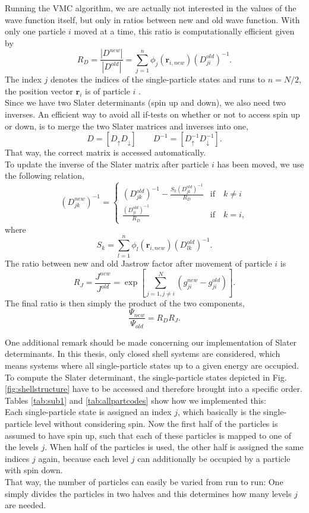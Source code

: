 Running the VMC algorithm, we are actually not interested in the values of the wave function itself, but only in ratios between new and old wave function. With only one particle $i$ moved at a time, this ratio is computationally efficient given by \cite{SkriptMorten}
\[
R_D = \frac{|D^{new}|}{|D^{old}|} = \sum\limits_{j=1}^n \phi_j\left(\mathbf{r}_{i, new}\right) \left(D_{ji}^{old}\right)^{-1}.
\]
The index $j$ denotes the indices of the single-particle states and runs to $n= N/2$, the position vector $\mathbf{r}_i$ is of particle $i$ .\\
Since we have two Slater determinants (spin up and down), we also need two inverses. An efficient way to avoid all if-tests on whether or not to access spin up or down, is to merge the two Slater matrices and inverses into one,
\[
D = \left[ D_{\uparrow} D_{\downarrow} \right] \qquad D^{-1} = \left[ D_{\uparrow}^{-1} D_{\downarrow}^{-1} \right].
\]
That way, the correct matrix is accessed automatically.\\
To update the inverse of the Slater matrix after particle $i$ has been moved, we use the following relation,
\[
\left(D_{jk}^{new}\right)^{-1} = \begin{cases}
\left(D_{jk}^{old}\right)^{-1} - \frac{S_k \left(D_{jk}^{old}\right)^{-1}}{R_D} & \text{if}\quad k \neq i \\
\frac{\left(D_{ji}^{old}\right)^{-1}}{R_D} & \text{if}\quad k = i, 
\end{cases}
\]
where 
\[
S_k = \sum\limits_{l=1}^ n \phi_l\left(\mathbf{r}_{i, new}\right)\left(D_{lk}^{old}\right)^{-1}.
\]
The ratio between new and old Jastrow factor after movement of particle $i$ is
\[
R_J = \frac{J^{new}}{J^{old}} = \exp\left[\sum\limits_{j=1, j\neq i}^ N \left(g_{ji}^{new} - g_{ji}^{old}\right) \right].
\]
The final ratio is then simply the product of the two components,
\[
\frac{\Psi_{new}}{\Psi_{old}} = R_D R_J.
\]

One additional remark should be made concerning our implementation of Slater determinants. In this thesis, only closed shell systems are considered, which means systems where all single-particle states up to a given energy are occupied. 
To compute the Slater determinant, the single-particle states depicted in Fig. \ref{fig:shellstructure} have to be accessed and therefore brought into a specific order. Tables \ref{tab:sub1} and \ref{tab:allpartcodes} show how we implemented this: \\
Each single-particle state is assigned an index $j$, which basically is the single-particle level without considering spin.
 Now the first half of the particles is assumed to have spin up, such that each of these particles is mapped to one of the levels $j$. When half of the particles is used, the other half is assigned the same indices $j$ again, because each level $j$ can additionally be occupied by a particle with spin down.\\
That way, the number of particles can easily be varied from run to run: One simply divides the particles in two halves and this determines how many levels $j$ are needed.

